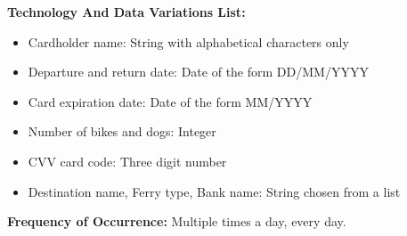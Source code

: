 \textbf{Technology And Data Variations List:} 
\begin{itemize}
    \item Cardholder name: String with alphabetical characters only
    \item Departure and return date: Date of the form DD/MM/YYYY
    \item Card expiration date: Date of the form MM/YYYY
    \item Number of bikes and dogs: Integer
    \item CVV card code: Three digit number
    \item Destination name, Ferry type, Bank name: String chosen from a list
    \end{itemize}

\textbf{Frequency of Occurrence:} Multiple times a day, every day.

